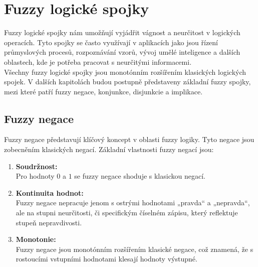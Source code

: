 \section{Fuzzy logick\'e spojky}

Fuzzy logické spojky n\'am umo\v z\v nují vyjádřit vágnost a neurčitost v logických operacích. Tyto spojky se často využívají v aplikacích jako jsou řízení průmyslových procesů, rozpoznávání vzorů, vývoj umělé inteligence a dalších oblastech, kde je potřeba pracovat s neurčitými informacemi.\\

V\v sechny fuzzy logick\'e spojky jsou monot\'onn\'im roz\v s\'i\v ren\'im klasick\'ych logick\'ych spojek. V dalších kapitolách budou postupně představeny základní fuzzy spojky, mezi kter\'e  patří 
fuzzy negace, konjunkce, disjunkcie a implikace. 

\subsection{Fuzzy negace}

Fuzzy negace představují klíčový koncept v oblasti fuzzy logiky. Tyto negace jsou zobecn\v en\'im klasick\'ych negac\'i. Základní vlastnosti fuzzy negací jsou:

\begin{enumerate}
\item \textbf{Soudržnost:}\\
Pro hodnoty $0$ a $1$ se fuzzy negace shoduje s klasickou negac\'i.
    \item \textbf{Kontinuita hodnot:} \\
        Fuzzy negace nepracuje jenom s  ostrými hodnotami „pravda“ a „nepravda“, ale na stupni neurčitosti, či specifickým číselném zápisu, který reflektuje stupeň nepravdivosti.
    \item \textbf{Monotonie:} \\
        Fuzzy negace jsou monot\'onn\'im roz\v s\'i\v ren\'im klasick\'e negace, což znamená, že s rostoucími vstupn\'imi hodnotami klesaj\'i hodnoty výstupn\'e.
    
\end{enumerate}

